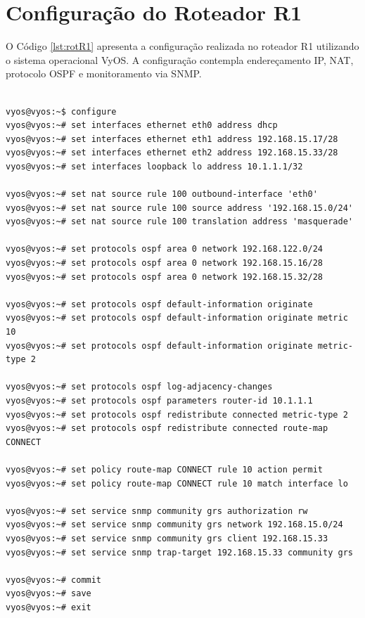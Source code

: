 \section{Configuração do Roteador R1}

O Código \ref{lst:rotR1} apresenta a configuração realizada no roteador R1 utilizando o sistema operacional VyOS. A configuração contempla endereçamento IP, NAT, protocolo OSPF e monitoramento via SNMP.

\begin{listing}[H]
\centering
\begin{verbatim}

vyos@vyos:~$ configure
vyos@vyos:~# set interfaces ethernet eth0 address dhcp
vyos@vyos:~# set interfaces ethernet eth1 address 192.168.15.17/28
vyos@vyos:~# set interfaces ethernet eth2 address 192.168.15.33/28
vyos@vyos:~# set interfaces loopback lo address 10.1.1.1/32

vyos@vyos:~# set nat source rule 100 outbound-interface 'eth0'
vyos@vyos:~# set nat source rule 100 source address '192.168.15.0/24'
vyos@vyos:~# set nat source rule 100 translation address 'masquerade'

vyos@vyos:~# set protocols ospf area 0 network 192.168.122.0/24
vyos@vyos:~# set protocols ospf area 0 network 192.168.15.16/28
vyos@vyos:~# set protocols ospf area 0 network 192.168.15.32/28

vyos@vyos:~# set protocols ospf default-information originate 
vyos@vyos:~# set protocols ospf default-information originate metric 10
vyos@vyos:~# set protocols ospf default-information originate metric-type 2

vyos@vyos:~# set protocols ospf log-adjacency-changes
vyos@vyos:~# set protocols ospf parameters router-id 10.1.1.1
vyos@vyos:~# set protocols ospf redistribute connected metric-type 2
vyos@vyos:~# set protocols ospf redistribute connected route-map CONNECT

vyos@vyos:~# set policy route-map CONNECT rule 10 action permit
vyos@vyos:~# set policy route-map CONNECT rule 10 match interface lo

vyos@vyos:~# set service snmp community grs authorization rw
vyos@vyos:~# set service snmp community grs network 192.168.15.0/24
vyos@vyos:~# set service snmp community grs client 192.168.15.33
vyos@vyos:~# set service snmp trap-target 192.168.15.33 community grs

vyos@vyos:~# commit
vyos@vyos:~# save
vyos@vyos:~# exit

\end{verbatim}
\caption{Configuração do roteador R1 em VyOS}
\label{lst:rotR1}
\end{listing}

